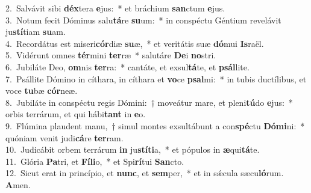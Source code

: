 {2.~}Salvávit sibi \textbf{déx}tera \textbf{e}jus:~* et bráchium \textbf{san}ctum \textbf{e}jus.\\
{3.~}Notum fecit Dóminus salu\textbf{tá}re \textbf{su}um:~* in conspéctu Géntium revelávit ju\textbf{stí}tiam \textbf{su}am.\\
{4.~}Recordátus est miseri\textbf{cór}diæ \textbf{su}æ,~* et veritátis suæ \textbf{dó}mui \textbf{Is}raël.\\
{5.~}Vidérunt omnes \textbf{tér}mini \textbf{ter}ræ~* salutáre \textbf{De}i \textbf{no}stri.\\
{6.~}Jubiláte Deo, \textbf{om}nis \textbf{ter}ra:~* cantáte, et exsul\textbf{tá}te, et \textbf{psál}lite.\\
{7.~}Psállite Dómino in cíthara, in cíthara et \textbf{vo}ce \textbf{psal}mi:~* in tubis ductílibus, et voce \textbf{tu}bæ \textbf{cór}neæ.\\
{8.~}Jubiláte in conspéctu regis Dómini:~† moveátur mare, et pleni\textbf{tú}do \textbf{e}jus:~* orbis terrárum, et qui hábi\textbf{tant} in \textbf{e}o.\\
{9.~}Flúmina plaudent manu,~† simul montes exsultábunt a con\textbf{spé}ctu \textbf{Dó}\textbf{mi}ni:~* quóniam venit judi\textbf{cá}re \textbf{ter}ram.\\
{10.~}Judicábit orbem terrárum \textbf{in} ju\textbf{stí}\textbf{ti}a,~* et pópulos in \textbf{æ}qui\textbf{tá}te.\\
{11.~}Glória \textbf{Pa}tri, et \textbf{Fí}\textbf{li}o,~* et Spi\textbf{rí}tui \textbf{San}cto.\\
{12.~}Sicut erat in princípio, et \textbf{nunc}, et \textbf{sem}per,~* et in sǽcula sæcu\textbf{ló}rum. \textbf{A}men.\\
